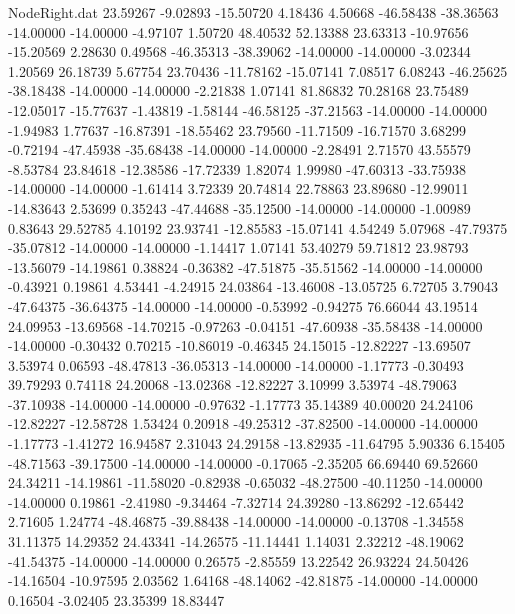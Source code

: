 \begin{filecontents}{NodeRight.dat}
  23.59267   -9.02893  -15.50720     4.18436    4.50668  -46.58438  -38.36563  -14.00000  -14.00000   -4.97107    1.50720   48.40532   52.13388
  23.63313  -10.97656  -15.20569     2.28630    0.49568  -46.35313  -38.39062  -14.00000  -14.00000   -3.02344    1.20569   26.18739    5.67754
  23.70436  -11.78162  -15.07141     7.08517    6.08243  -46.25625  -38.18438  -14.00000  -14.00000   -2.21838    1.07141   81.86832   70.28168
  23.75489  -12.05017  -15.77637    -1.43819   -1.58144  -46.58125  -37.21563  -14.00000  -14.00000   -1.94983    1.77637  -16.87391  -18.55462
  23.79560  -11.71509  -16.71570     3.68299   -0.72194  -47.45938  -35.68438  -14.00000  -14.00000   -2.28491    2.71570   43.55579   -8.53784
  23.84618  -12.38586  -17.72339     1.82074    1.99980  -47.60313  -33.75938  -14.00000  -14.00000   -1.61414    3.72339   20.74814   22.78863
  23.89680  -12.99011  -14.83643     2.53699    0.35243  -47.44688  -35.12500  -14.00000  -14.00000   -1.00989    0.83643   29.52785    4.10192
  23.93741  -12.85583  -15.07141     4.54249    5.07968  -47.79375  -35.07812  -14.00000  -14.00000   -1.14417    1.07141   53.40279   59.71812
  23.98793  -13.56079  -14.19861     0.38824   -0.36382  -47.51875  -35.51562  -14.00000  -14.00000   -0.43921    0.19861    4.53441   -4.24915
  24.03864  -13.46008  -13.05725     6.72705    3.79043  -47.64375  -36.64375  -14.00000  -14.00000   -0.53992   -0.94275   76.66044   43.19514
  24.09953  -13.69568  -14.70215    -0.97263   -0.04151  -47.60938  -35.58438  -14.00000  -14.00000   -0.30432    0.70215  -10.86019   -0.46345
  24.15015  -12.82227  -13.69507     3.53974    0.06593  -48.47813  -36.05313  -14.00000  -14.00000   -1.17773   -0.30493   39.79293    0.74118
  24.20068  -13.02368  -12.82227     3.10999    3.53974  -48.79063  -37.10938  -14.00000  -14.00000   -0.97632   -1.17773   35.14389   40.00020
  24.24106  -12.82227  -12.58728     1.53424    0.20918  -49.25312  -37.82500  -14.00000  -14.00000   -1.17773   -1.41272   16.94587    2.31043
  24.29158  -13.82935  -11.64795     5.90336    6.15405  -48.71563  -39.17500  -14.00000  -14.00000   -0.17065   -2.35205   66.69440   69.52660
  24.34211  -14.19861  -11.58020    -0.82938   -0.65032  -48.27500  -40.11250  -14.00000  -14.00000    0.19861   -2.41980   -9.34464   -7.32714
  24.39280  -13.86292  -12.65442     2.71605    1.24774  -48.46875  -39.88438  -14.00000  -14.00000   -0.13708   -1.34558   31.11375   14.29352
  24.43341  -14.26575  -11.14441     1.14031    2.32212  -48.19062  -41.54375  -14.00000  -14.00000    0.26575   -2.85559   13.22542   26.93224
  24.50426  -14.16504  -10.97595     2.03562    1.64168  -48.14062  -42.81875  -14.00000  -14.00000    0.16504   -3.02405   23.35399   18.83447

\end{filecontents}
